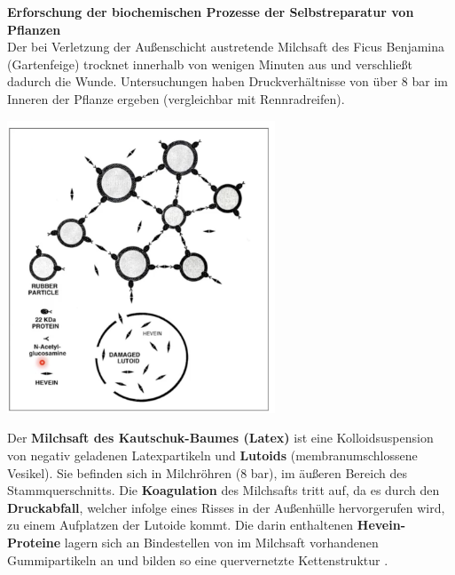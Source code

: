 \vspace*{2\baselineskip}

\textbf{Erforschung der biochemischen Prozesse der Selbstreparatur von Pflanzen}\\

Der bei Verletzung der Außenschicht austretende Milchsaft des Ficus Benjamina (Gartenfeige) trocknet innerhalb von wenigen Minuten aus und verschließt dadurch die Wunde. Untersuchungen haben Druckverhältnisse von über 8 bar im Inneren der Pflanze ergeben (vergleichbar mit Rennradreifen).\\

\begin{center}
    \includegraphics[width=8cm]{lec5/figures/milchsaft.png}
\end{center}
Der \textbf{Milchsaft des Kautschuk-Baumes (Latex)} ist eine Kolloidsuspension von negativ geladenen Latexpartikeln und \textbf{Lutoids} (membranumschlossene Vesikel). Sie befinden sich in Milchröhren (8 bar), im äußeren Bereich des Stammquerschnitts. Die \textbf{Koagulation} des Milchsafts tritt auf, da es durch den \textbf{Druckabfall}, welcher infolge eines Risses in der Außenhülle hervorgerufen wird, zu einem Aufplatzen der Lutoide kommt. Die darin enthaltenen \textbf{Hevein-Proteine} lagern sich an Bindestellen von im Milchsaft vorhandenen Gummipartikeln an und bilden so eine quervernetzte Kettenstruktur \dangersign.\\

